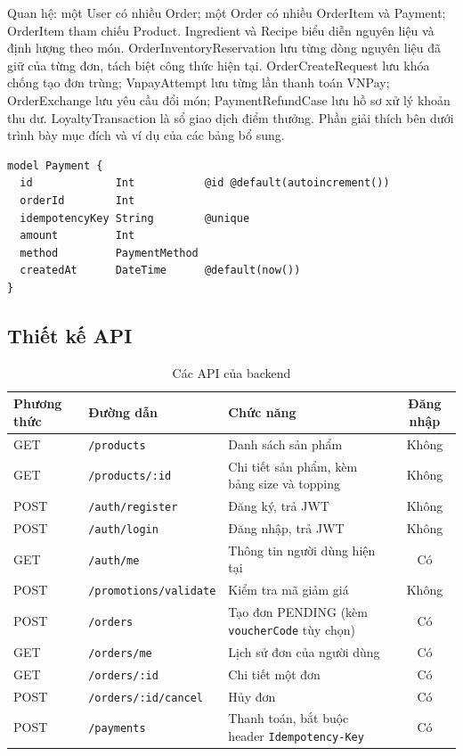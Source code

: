 \documentclass[a4paper]{article}
\begin{document}
Quan hệ: một User có nhiều Order; một Order có nhiều OrderItem và Payment; OrderItem tham chiếu Product. Ingredient và Recipe biểu diễn nguyên liệu và định lượng theo món. OrderInventoryReservation lưu từng dòng nguyên liệu đã giữ của từng đơn, tách biệt công thức hiện tại. OrderCreateRequest lưu khóa chống tạo đơn trùng; VnpayAttempt lưu từng lần thanh toán VNPay; OrderExchange lưu yêu cầu đổi món; PaymentRefundCase lưu hồ sơ xử lý khoản thu dư. LoyaltyTransaction là sổ giao dịch điểm thưởng. Phần giải thích bên dưới trình bày mục đích và ví dụ của các bảng bổ sung.

\begin{lstlisting}[style=brew]
model Payment {
  id             Int           @id @default(autoincrement())
  orderId        Int
  idempotencyKey String        @unique
  amount         Int
  method         PaymentMethod
  createdAt      DateTime      @default(now())
}
\end{lstlisting}

\subsection{Thiết kế API}
\begin{table}[h!]
\centering
\footnotesize
\begin{tabularx}{\textwidth}{|l|l|X|c|}
\hline
\textbf{Phương thức} & \textbf{Đường dẫn} & \textbf{Chức năng} & \textbf{Đăng nhập} \\ \hline
GET & \texttt{/products} & Danh sách sản phẩm & Không \\ \hline
GET & \texttt{/products/:id} & Chi tiết sản phẩm, kèm bảng size và topping & Không \\ \hline
POST & \texttt{/auth/register} & Đăng ký, trả JWT & Không \\ \hline
POST & \texttt{/auth/login} & Đăng nhập, trả JWT & Không \\ \hline
GET & \texttt{/auth/me} & Thông tin người dùng hiện tại & Có \\ \hline
POST & \texttt{/promotions/validate} & Kiểm tra mã giảm giá & Không \\ \hline
POST & \texttt{/orders} & Tạo đơn PENDING (kèm \texttt{voucherCode} tùy chọn) & Có \\ \hline
GET & \texttt{/orders/me} & Lịch sử đơn của người dùng & Có \\ \hline
GET & \texttt{/orders/:id} & Chi tiết một đơn & Có \\ \hline
POST & \texttt{/orders/:id/cancel} & Hủy đơn & Có \\ \hline
POST & \texttt{/payments} & Thanh toán, bắt buộc header \texttt{Idempotency-Key} & Có \\ \hline
\end{tabularx}
\caption{Các API của backend}
\end{table}
\end{document}

